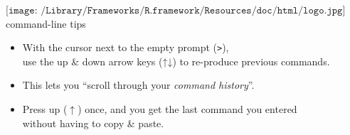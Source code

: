 \documentclass[
  ignorenonframetext,
]{beamer}
\newcommand{\AlertTok}[1]{\textcolor[rgb]{0.94,0.16,0.16}{#1}}
\newcommand{\OtherTok}[1]{\textcolor[rgb]{0.56,0.35,0.01}{#1}}
\begin{document}
\begin{frame}{\(\texttt{[image: /Library/Frameworks/R.framework/Resources/doc/html/logo.jpg]}\)
command-line tips}
\protect\hypertarget{includegraphicsheight1emlibraryframeworksr.frameworkresourcesdochtmllogo.jpg-command-line-tips}{}
\begin{itemize}
\item
  With the cursor next to the empty prompt (\OtherTok{\texttt{>}}),\\
  use the up \& down \AlertTok{arrow keys} (↑↓) to re-produce previous
  commands.
\item
  This lets you ``scroll through your \emph{command history}''.
\item
  Press \AlertTok{up} (\AlertTok{$\uparrow$}) once, and you get the last
  command you entered\\
  without having to copy \& paste.
\end{itemize}
\end{frame}
\end{document}
